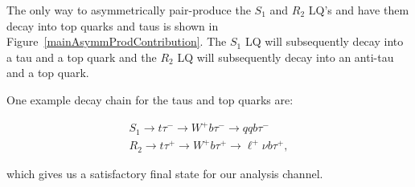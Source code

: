         
        
        The only way to asymmetrically pair-produce the $S_1$ and $R_2$ LQ's and have them decay into top quarks and taus is shown in Figure~\ref{mainAsymmProdContribution}. The $S_1$ LQ will subsequently decay into a tau and a top quark and the $R_2$ LQ will subsequently decay into an anti-tau and a top quark.

        One example decay chain for the taus and top quarks are:

        \begin{gather}
            S_1 \rightarrow t\tau^- \rightarrow W^+ b \tau^- \rightarrow qqb\tau^- \\
            R_2 \rightarrow t\tau^+ \rightarrow W^+ b \tau^+ \rightarrow \ell^+ \nu b \tau^+,
        \end{gather}

        which gives us a satisfactory final state for our analysis channel.
